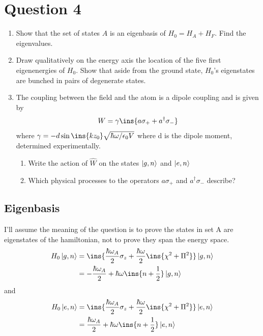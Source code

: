 \clearpage
\section{Question 4}
\begin{colbox}
	\begin{enumerate}
		\item Show that the set of states $A$ is an eigenbasis of $H_0 = H_A+H_F$. Find the eigenvalues.
		\item Draw qualitatively on the energy axis the location of the five first eigenenergies of $H_0$. Show that aside from the ground state, $H_0$'s eigenstates are bunched in pairs of degenerate states.
		\item The coupling between the field and the atom is a dipole coupling and is given by
		\begin{equation*}
			W = \gamma\ins{a\sigma_++a^\dagger\sigma_-}
		\end{equation*}
		where $\gamma = -d\sin\ins{kz_0}\sqrt{\hbar\omega/\epsilon_0V}$ where d is the dipole moment, determined experimentally.
		\begin{enumerate}
			\item Write the action of $\hat W$ on the states $\ket{g,n}$ and $\ket{e,n}$
			\item Which physical processes to the operators $a\sigma_+$ and $a^\dagger\sigma_-$ describe?
		\end{enumerate}
	\end{enumerate}
\end{colbox}
\subsection{Eigenbasis}
I'll assume the meaning of the question is to prove the states in set A are eigenstates of the hamiltonian, not to prove they span the energy space.
\begin{align}
	H_0\ket{g,n} &= \ins{\frac{\hbar\omega_A}{2}\sigma_z+\frac{\hbar\omega}{2}\ins{\chi^2+\Pi^2}}\ket{g,n}\\
	&= -\frac{\hbar\omega_A}{2}+\hbar\omega\ins{n+\frac{1}{2}}\ket{g,n}
\end{align}
and
\begin{align}
	H_0\ket{e,n} &= \ins{\frac{\hbar\omega_A}{2}\sigma_z+\frac{\hbar\omega}{2}\ins{\chi^2+\Pi^2}}\ket{e,n}\\
	&= \frac{\hbar\omega_A}{2}+\hbar\omega\ins{n+\frac{1}{2}}\ket{e,n}
\end{align}
\newpage
